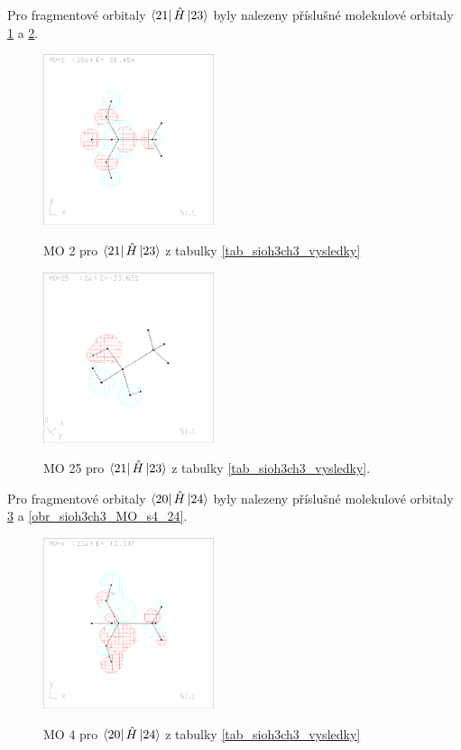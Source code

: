 \documentclass[
  digital, %
  table,   %
  lof,     %
  lot,     %
]{fithesis3}
\begin{document}
 \clearpage
 
  Pro fragmentové orbitaly $\bra{21}{\hat{H}}\ket{23}$ byly nalezeny příslušné molekulové orbitaly \ref{obr_sioh3ch3_MO_s3_2} a \ref{obr_sioh3ch3_MO_s3_25}.
  
  \begin{figure}[h]
\caption{MO 2 pro $\bra{21}{\hat{H}}\ket{23}$ z tabulky \ref{tab_sioh3ch3_vysledky}}
  \center
  \includegraphics[width=5cm]{sioh3ch3_obrazky/s3_2.eps}
  \label{obr_sioh3ch3_MO_s3_2}
  \end{figure}

\begin{figure}[h]
\caption{MO 25 pro $\bra{21}{\hat{H}}\ket{23}$ z tabulky \ref{tab_sioh3ch3_vysledky}.  }
  \center
  \includegraphics[width=5cm]{sioh3ch3_obrazky/s3_25.eps}
  \label{obr_sioh3ch3_MO_s3_25}
  \end{figure}
  
   Pro fragmentové orbitaly $\bra{20}{\hat{H}}\ket{24}$ byly nalezeny příslušné molekulové orbitaly \ref{obr_sioh3ch3_MO_s4_4} a \ref{obr_sioh3ch3_MO_s4_24}.
  
  \begin{figure}[h]
\caption{MO 4 pro $\bra{20}{\hat{H}}\ket{24}$ z tabulky \ref{tab_sioh3ch3_vysledky}}
  \center
  \includegraphics[width=5cm]{sioh3ch3_obrazky/s4_4.eps}
  \label{obr_sioh3ch3_MO_s4_4}
  \end{figure}
\end{document}
